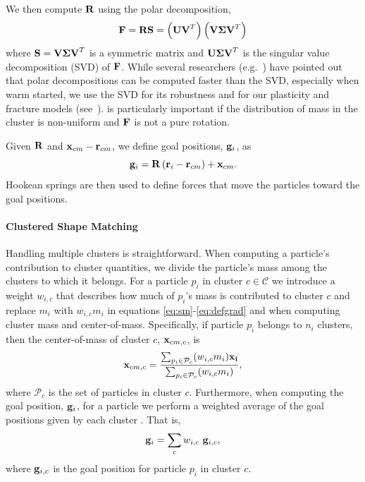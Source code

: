 \documentclass[conference]{acmsiggraph}
\begin{document}
We then compute $\mathit{\mathbf{R}}$ using the polar decomposition,
\begin{equation}
\label{eq:decomp}
\mathit{\mathbf{F}} = \mathit{\mathbf{R}}\mathit{\mathbf{S}} = \left(\mathit{\mathbf{UV}}^T\right)\left(\mathit{\mathbf{V\Sigma V}}^T\right)
\end{equation}
where $\mathit{\mathbf{S}}=\mathit{\mathbf{V\Sigma V}}^T$ is a symmetric matrix and $\mathit{\mathbf{U\Sigma V}}^T$ is the singular value decomposition (SVD) of $\mathit{\mathbf{F}}$.
While several researchers (e.g.~\cite{Rivers:2007:FFL}) have pointed out that polar decompositions can be computed faster than the SVD,
especially when warm started, we use the SVD for its robustness and for our plasticity and fracture models 
(see~).  
is particularly important if the distribution of mass in the cluster is non-uniform and $\mathit{\mathbf{F}}$ is not a pure rotation.

Given $\mathit{\mathbf{R}}$ and $\mathit{\mathbf{x}}_{cm}-\mathit{\mathbf{r}}_{cm}$, we define goal positions, $\mathit{\mathbf{g}}_i$, as
\begin{equation}
\mathit{\mathbf{g}}_i = \mathit{\mathbf{R}}\left(\mathit{\mathbf{r}}_i-\mathit{\mathbf{r}}_{cm}\right)+\mathit{\mathbf{x}}_{cm}.
\end{equation}
Hookean springs are then used to define forces that move the particles toward the goal positions.

\paragraph{Clustered Shape Matching}
Handling multiple clusters is straightforward.  When computing a particle's contribution to 
cluster quantities, we divide the particle's mass among the clusters to which it belongs.
For a particle $p_i$ in cluster $c\in\mathcal{C}$ we introduce a weight $w_{i,c}$ that
describes how much of $p_i$'s mass is contributed to cluster $c$
and replace $m_i$ with $w_{i,c}m_i$ in equations \eqref{eq:sm}-\eqref{eq:defgrad} 
and when computing cluster mass and center-of-mass.
Specifically, if particle $p_i$ belongs
to $n_i$ clusters, then the center-of-mass of cluster $c$, $\mathit{\mathbf{x}}_{cm,c}$, is
\begin{equation}
\mathit{\mathbf{x}}_{cm,c} = \frac{\sum_{p_i\in\mathcal{P}_c}(w_{i,c}m_i)\mathit{\mathbf{x_i}}}{\sum_{p_i\in\mathcal{P}_c}(w_{i,c}m_i)},
\end{equation}
where $\mathcal{P}_c$ is the set of particles in cluster $c$.
Furthermore, when computing the goal position, $\mathit{\mathbf{g}}_i$, for a particle we perform a weighted
average of the goal positions given by each cluster .  That is,
\begin{equation}
\mathit{\mathbf{g}}_i = \sum_c w_{i,c} ~\mathit{\mathbf{g}}_{i,c},
\end{equation}
where $\mathit{\mathbf{g}}_{i,c}$ is the goal position for particle $p_i$ in cluster $c$.  
\end{document}
